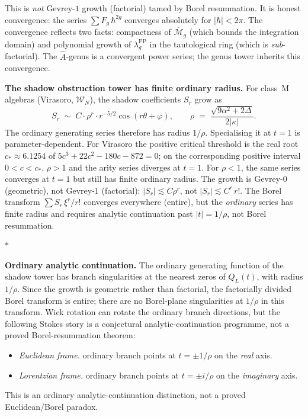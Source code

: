 \documentclass[11pt]{article}
\newcommand{\cM}{\mathcal{M}}
\newcommand{\cW}{\mathcal{W}}
\newcommand{\sep}{\bigskip\begin{center}$*$\end{center}\medskip}
\begin{document}
This is \emph{not} Gevrey-$1$ growth (factorial) tamed by Borel
resummation.  It is honest convergence: the series
$\sum F_g\,\hbar^{2g}$ converges absolutely for
$|\hbar| < 2\pi$.  The convergence reflects two facts:
compactness of $\overline{\cM}_g$ (which bounds the integration
domain) and polynomial growth of $\lambda_g^{\mathrm{FP}}$ in
the tautological ring (which is \emph{sub}-factorial).  The
$\hat{A}$-genus is a convergent power series; the genus tower
inherits this convergence.

\medskip
\noindent\textbf{The shadow obstruction tower has finite ordinary radius.}\enspace
For class~M algebras (Virasoro, $\cW_N$), the shadow
coefficients $S_r$ grow as
\[
S_r \;\sim\; C \cdot \rho^r \cdot r^{-5/2}
  \cos(r\theta + \varphi),
\qquad
\rho \;=\; \frac{\sqrt{9\alpha^2 + 2\Delta}}{2|\kappa|}.
\]
The ordinary generating series therefore has radius $1/\rho$.
Specialising it at $t=1$ is parameter-dependent.  For Virasoro the
positive critical threshold is the real root
$c_* \approx 6.1254$ of
$5c^3+22c^2-180c-872=0$; on the corresponding positive interval
$0<c<c_*$, $\rho>1$ and the arity series diverges at $t=1$.
For $\rho<1$, the same series converges at $t=1$ but still has
finite ordinary radius.  The growth is Gevrey-$0$ (geometric),
not Gevrey-$1$ (factorial): $|S_r| \lesssim C\rho^r$, not
$|S_r| \lesssim C^r\,r!$.  The Borel transform
$\sum S_r\,\xi^r/r!$ converges everywhere (entire), but the
\emph{ordinary} series has finite radius and requires analytic
continuation past $|t| = 1/\rho$, not Borel resummation.

\sep

\noindent\textbf{Ordinary analytic continuation.}\enspace
The ordinary generating function of the shadow tower has branch
singularities at the nearest zeros of $Q_L(t)$, with radius
$1/\rho$.  Since the growth is geometric rather than factorial,
the factorially divided Borel transform is entire; there are no
Borel-plane singularities at $1/\rho$ in this transform.  Wick
rotation can rotate the ordinary branch directions, but the
following Stokes story is a conjectural analytic-continuation
programme, not a proved Borel-resummation theorem:
\begin{itemize}[nosep]
\item \emph{Euclidean frame.}  ordinary branch points at
  $t = \pm 1/\rho$ on the \emph{real} axis.
\item \emph{Lorentzian frame.}  ordinary branch points at
  $t = \pm i/\rho$ on the \emph{imaginary} axis.
\end{itemize}
This is an ordinary analytic-continuation distinction, not a
proved Euclidean/Borel paradox.
\end{document}
